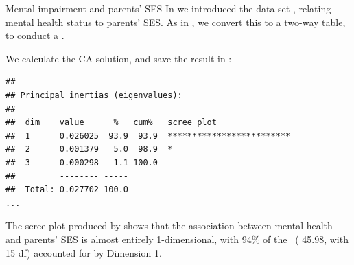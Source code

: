 \documentclass[11pt]{book}
\renewenvironment{knitrout}{\small\renewcommand{\baselinestretch}{.85}}{} %
\begin{document}
\begin{Example}[mental3]{Mental impairment and parents' SES}
In  we introduced the data set , 
relating mental health status to parents' SES.
As in , we convert this to a two-way table, 
to conduct a \ca.

\begin{knitrout}
\color{fgcolor}\begin{kframe}
\begin{alltt}
\hlstd{(}\hlstd{,} \hlstd{=}\hlstd{)}
 \hlkwb{<-}  \hlopt{~}  \hlopt{+}  
\end{alltt}
\end{kframe}
\end{knitrout}
We calculate the CA solution, and save the result in :
\begin{knitrout}
\color{fgcolor}\begin{kframe}
\begin{alltt}
 \hlkwb{<-} 
\end{alltt}
\begin{verbatim}
## 
## Principal inertias (eigenvalues):
## 
##  dim    value      %   cum%   scree plot               
##  1      0.026025  93.9  93.9  *************************
##  2      0.001379   5.0  98.9  *                        
##  3      0.000298   1.1 100.0                           
##         -------- -----                                 
##  Total: 0.027702 100.0                                 
...
\end{verbatim}
\end{kframe}
\end{knitrout}
The scree plot produced by 
shows that the association between mental health
and parents' SES is almost entirely 1-dimensional, with 94\% of
the \chisq\ ( 45.98, with 15 df) accounted for by Dimension 1.


\end{Example}
\end{document}
